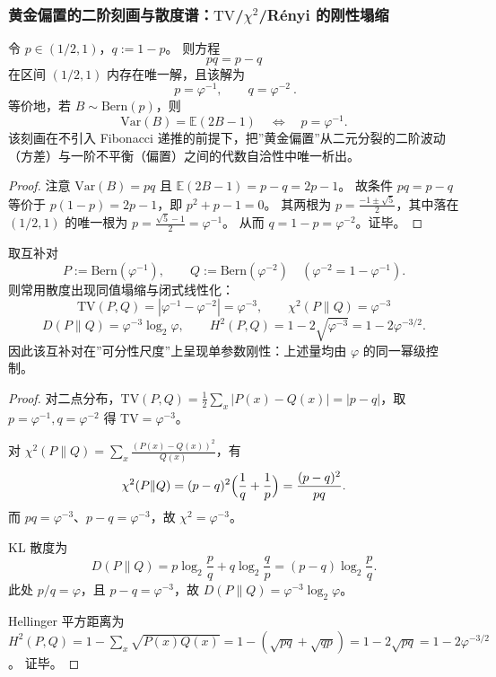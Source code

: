 \subsubsection{黄金偏置的二阶刻画与散度谱：\texorpdfstring{$\mathrm{TV}$}{TV}/\texorpdfstring{$\chi^2$}{chi2}/Rényi 的刚性塌缩}

\begin{proposition}[黄金偏置的“方差=偏置”刻画与唯一性]\label{prop:pom-golden-bias-variance-equals-bias}
令 \(p\in(1/2,1)\)，\(q:=1-p\)。
则方程
\[
pq=p-q
\]
在区间 \((1/2,1)\) 内存在唯一解，且该解为
\[
\boxed{\ p=\varphi^{-1},\qquad q=\varphi^{-2}\ }.
\]
等价地，若 \(B\sim\mathrm{Bern}(p)\)，则
\[
\mathrm{Var}(B)=\mathbb{E}(2B-1)
\quad\Longleftrightarrow\quad
p=\varphi^{-1}.
\]
该刻画在不引入 Fibonacci 递推的前提下，把”黄金偏置”从二元分裂的二阶波动（方差）与一阶不平衡（偏置）之间的代数自洽性中唯一析出。
\end{proposition}

\begin{proof}
注意 \(\mathrm{Var}(B)=pq\) 且 \(\mathbb{E}(2B-1)=p-q=2p-1\)。
故条件 \(pq=p-q\) 等价于
\(
p(1-p)=2p-1
\)，即
\(
p^2+p-1=0
\)。
其两根为 \(p=\frac{-1\pm\sqrt5}{2}\)，其中落在 \((1/2,1)\) 的唯一根为 \(p=\frac{\sqrt5-1}{2}=\varphi^{-1}\)。
从而 \(q=1-p=\varphi^{-2}\)。证毕。
\end{proof}

\begin{proposition}\label{prop:pom-complementary-golden-bernoulli-divergence-collapse}
取互补对
\[
P:=\mathrm{Bern}(\varphi^{-1}),\qquad
Q:=\mathrm{Bern}(\varphi^{-2})\quad(\varphi^{-2}=1-\varphi^{-1}).
\]
则常用散度出现同值塌缩与闭式线性化：
\[
\boxed{\;
\mathrm{TV}(P,Q)=|\varphi^{-1}-\varphi^{-2}|=\varphi^{-3},\qquad
\chi^2(P\|Q)=\varphi^{-3}\;}
\]
\[
\boxed{\;
D(P\|Q)=\varphi^{-3}\log_2\varphi,\qquad
H^2(P,Q)=1-2\sqrt{\varphi^{-3}}=1-2\varphi^{-3/2}.\;}
\]
因此该互补对在”可分性尺度”上呈现单参数刚性：上述量均由 \(\varphi\) 的同一幂级控制。
\end{proposition}

\begin{proof}
对二点分布，\(\mathrm{TV}(P,Q)=\frac12\sum_x|P(x)-Q(x)|=|p-q|\)，取 \(p=\varphi^{-1},q=\varphi^{-2}\) 得 \(\mathrm{TV}=\varphi^{-3}\)。
\par
对 \(\chi^2(P\|Q)=\sum_x \frac{(P(x)-Q(x))^2}{Q(x)}\)，有
\[
\chi^2(P\|Q)=(p-q)^2\Bigl(\frac{1}{q}+\frac{1}{p}\Bigr)=\frac{(p-q)^2}{pq}.
\]
而 \(pq=\varphi^{-3}\)、\(p-q=\varphi^{-3}\)，故 \(\chi^2=\varphi^{-3}\)。
\par
KL 散度为
\[
D(P\|Q)=p\log_2\frac{p}{q}+q\log_2\frac{q}{p}=(p-q)\log_2\frac{p}{q}.
\]
此处 \(p/q=\varphi\)，且 \(p-q=\varphi^{-3}\)，故 \(D(P\|Q)=\varphi^{-3}\log_2\varphi\)。
\par
Hellinger 平方距离为
\(
H^2(P,Q)=1-\sum_x\sqrt{P(x)Q(x)}=1-(\sqrt{pq}+\sqrt{qp})=1-2\sqrt{pq}=1-2\varphi^{-3/2}
\)。
证毕。
\end{proof}

